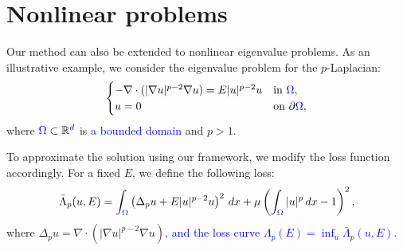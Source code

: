 \documentclass[10pt]{amsart}
\newcommand{\rev}[1]{\textcolor{blue}{#1}}
\theoremstyle{definition}
\theoremstyle{remark}
\theoremstyle{plain}
\newcommand{\R}{\mathbb{R}}
\begin{document}
\section{Nonlinear problems} \label{sec.nolin}

Our method can also be extended to nonlinear eigenvalue problems. As an illustrative example, we consider the eigenvalue problem for the $p$-Laplacian:
\begin{equation}\label{p-eigen}
\begin{cases}
-\nabla \cdot (|\nabla u|^{p-2} \nabla u) = E |u|^{p-2} u & \text{in } \rev{\Omega}, \\
u = 0 & \text{on } \partial \rev{\Omega},
\end{cases}
\end{equation}
where $\rev{\Omega} \subset \R^{\rev{d}}$ is \rev{a bounded domain} and $p > 1$.

To approximate the solution using our framework, we modify the loss function accordingly. For a fixed $E$, we define the following loss:
\begin{equation}\label{loss.p}
\bar\Lambda_p(u, E) = \int_{\rev{\Omega}} \left( \Delta_p u + E |u|^{p-2} u \right)^2 \, dx + \mu \left( \int_{\rev{\Omega}} |u|^p\, dx - 1 \right)^2,
\end{equation}
where $\Delta_p u = \nabla \cdot (|\nabla u|^{p-2} \nabla u)$\rev{, and the loss curve $\Lambda_p(E)=\inf_u\bar\Lambda_p(u,E)$}.
\end{document}

